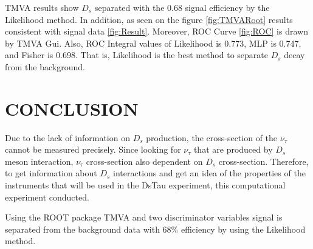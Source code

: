 \documentclass[12pt]{report}
\begin{document}
TMVA results show $D_s$ separated with the 0.68 signal efficiency by the Likelihood method. In addition, as seen on the figure \ref{fig:TMVARoot} results consistent with signal data \ref{fig:Result}. Moreover, ROC Curve \ref{fig:ROC} is drawn by TMVA Gui. Also, ROC Integral values of Likelihood is 0.773, MLP is 0.747, and Fisher is 0.698. That is, Likelihood is the best method to separate $D_s$ decay from the background.

\newpage

\section{CONCLUSION}

Due to the lack of information on $D_s$ production, the cross-section of the $\nu_\tau$ cannot be measured precisely. Since looking for $\nu_\tau$ that are produced by $D_s$ meson interaction, $\nu_\tau$ cross-section also dependent on $D_s$ cross-section. Therefore, to get information about $D_s$ interactions and get an idea of the properties of the instruments that will be used in the DsTau experiment, this computational experiment conducted. 

Using the ROOT package TMVA and two discriminator variables signal is separated from the background data with 68\% efficiency by using the Likelihood method.

{}

\end{document}
